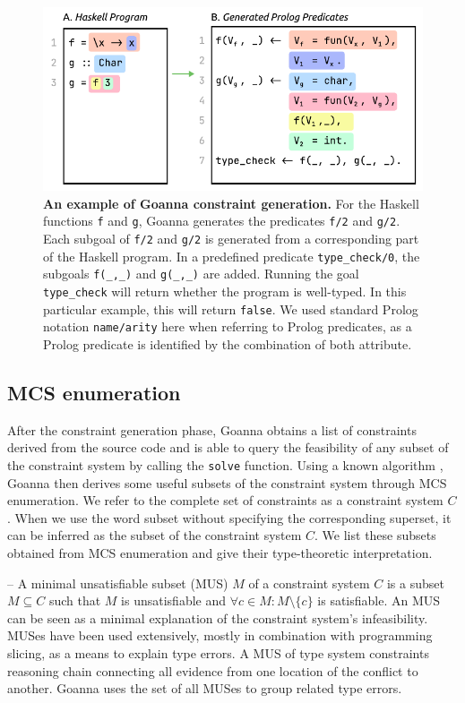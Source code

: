   \begin{figure}[htb]
        \centering
    \includegraphics[width=0.7\linewidth]{images/Translation-Example}
        \caption[An example of Goanna constraint generation]{\textbf{An example of Goanna constraint generation.} For the Haskell functions \texttt{f} and \texttt{g}, Goanna generates the predicates \texttt{f/2} and \texttt{g/2}. Each subgoal of \texttt{f/2} and \texttt{g/2} is generated from a corresponding part of the Haskell program. In a predefined predicate \texttt{type\_check/0}, the subgoals \texttt{f(\_,\_)} and \texttt{g(\_,\_)} are added. Running the goal \texttt{type\_check} will return whether the program is well-typed. In this particular example, this will return \texttt{false}. We used standard Prolog notation \texttt{name/arity} here when referring to Prolog predicates, as a Prolog predicate is identified by the combination of both attribute. 
}
        \label{fig:translation-example}
    \end{figure}
    

    \subsection{MCS enumeration} \label{sub:enumeration}
    After the constraint generation phase, Goanna obtains a list of constraints derived from the source code and is able to query the feasibility of any subset of the constraint system by calling the \texttt{solve} function. Using a known algorithm \cite{Liffiton2016-xi}, Goanna then derives some useful subsets of the constraint system through MCS enumeration. We refer to the complete set of constraints as a constraint system $C$. When we use the word subset without specifying the corresponding superset, it can be inferred as the subset of the constraint system $C$. We list these subsets obtained from MCS enumeration and give their type-theoretic interpretation. 
    
        
    – A minimal unsatisfiable subset (MUS) $M$ of a constraint system $C$ is a subset $M \subseteq C$ such that $M$ is unsatisfiable and $ \forall{c} \in M : M \setminus \{c\}$ is satisfiable. An MUS can be seen as a minimal explanation of the constraint system’s infeasibility. MUSes have been used extensively, mostly in combination with programming slicing, as a means to explain type errors. A MUS of type system constraints reasoning chain connecting all evidence from one location of the conflict to another. Goanna uses the set of all MUSes to group related type errors.

